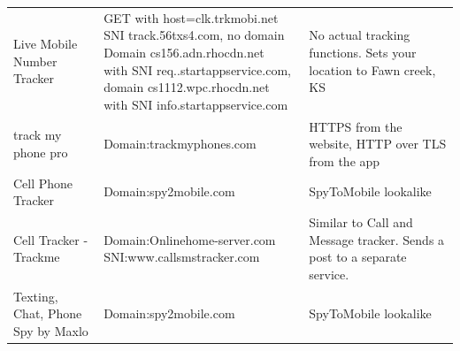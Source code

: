 \documentclass[acmtog]{acmart}
\begin{document}
\begin{table}
\begin{tabular}{p{5cm}p{5cm}p{5cm}}
		Live Mobile Number Tracker & \makecell{GET with host=clk.trkmobi.net\\
			SNI track.56txs4.com, no domain\\
			Domain cs156.adn.rhocdn.net\\ with SNI req..startappservice.com,\\
			domain cs1112.wpc.rhocdn.net\\ with SNI info.startappservice.com} & 
			No actual tracking functions. Sets your location to Fawn creek, KS 
			\\
		
		track my phone pro & Domain:trackmyphones.com & HTTPS from the website, 
		HTTP over TLS from the app \\
		
		Cell Phone Tracker & Domain:spy2mobile.com & SpyToMobile lookalike \\
		
		Cell Tracker - Trackme & Domain:Onlinehome-server.com
		SNI:www.callsmstracker.com & Similar to Call and Message tracker. Sends 
		a post to a separate service. \\
		
		Texting, Chat, Phone Spy by Maxlo & Domain:spy2mobile.com & SpyToMobile 
		lookalike \\
	\end{tabular}
	
\end{table}
\clearpage
\end{document}
